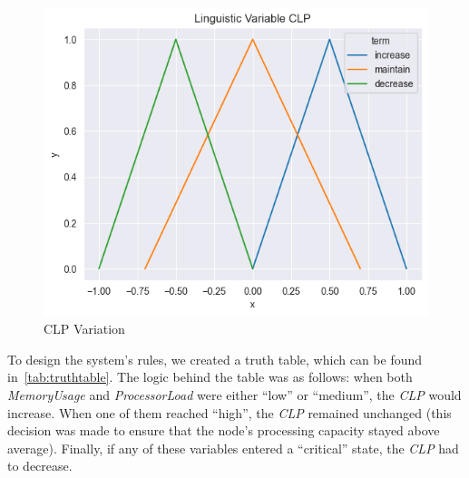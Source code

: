 \documentclass[titlepage]{article}
\begin{document}
\begin{figure}[htbp]
\begin{minipage}{0.32\textwidth}
    \end{minipage}
    \hfill
    \begin{minipage}{0.32\textwidth}
        \centering
        \includegraphics[width=\textwidth]{../images/triangular_CLP}
        \caption{CLP Variation}
        \label{fig:clp}
    \end{minipage}
\end{figure}


To design the system's rules, we created a truth table, which can be found in~\vref{tab:truthtable}.
The logic behind the table was as follows: when both \textit{MemoryUsage} and \textit{ProcessorLoad} were either ``low'' or ``medium'', the \textit{CLP} would increase.
When one of them reached ``high'', the \textit{CLP} remained unchanged (this decision was made to ensure that the node's processing capacity stayed above average).
Finally, if any of these variables entered a ``critical'' state, the \textit{CLP} had to decrease.
\end{document}
